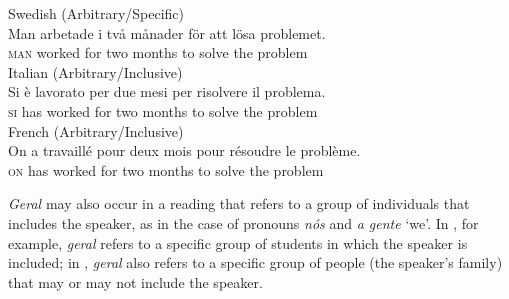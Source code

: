 \documentclass[output=paper]{langscibook}
\begin{document}
\ea\label{ex:avelar:35}
 \ea\label{ex:avelar:35a} Swedish (Arbitrary/Specific)\\
  \gll Man   arbetade   i två månader   för att lösa   problemet.\\
         \textsc{man} worked   for two months   to solve     the problem\\
 \ex\label{ex:avelar:35b} Italian (Arbitrary/Inclusive)\\
  \gll Si è lavorato     per due mesi     per risolvere   il problema.\\
        \textsc{si} has worked   for two months   to solve     the problem\\
 \ex\label{ex:avelar:35c} French (Arbitrary/Inclusive)\\
  \gll On a travaillé   pour deux mois   pour résoudre   le problème.\\
       \textsc{on} has worked   for two months   to solve       the problem\\
\z 
\z

{\textit{Geral} }{may also occur in a reading that refers to a group of individuals that includes the speaker, as in the case of pronouns} {\textit{nós} }{and} {\textit{a gente}} {‘we’. In , for example,} \textit{geral} {refers to a specific group of students in which the speaker is included; in ,} \textit{geral} {also refers to a specific group of people (the speaker’s family) that may or may not include the speaker.}
\end{document}
